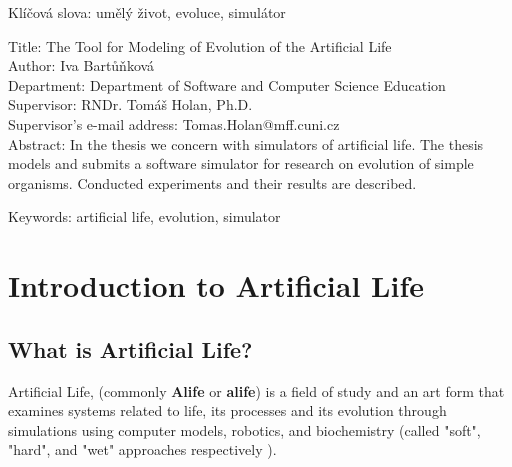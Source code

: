 \documentclass[a4paper,12pt]{report}
\begin{document}


\vspace{8mm}

\noindent Klíčová slova: umělý život, evoluce, simulátor

\vspace{10mm}

\noindent
Title: The Tool for Modeling of Evolution of the Artificial Life\\
Author: Iva Bartů\v{n}kov\'{a}\\
Department: Department of Software and Computer Science Education\\
Supervisor: RNDr. Tom\'{a}\v{s} Holan, Ph.D.\\
Supervisor's e-mail address: Tomas.Holan@mff.cuni.cz\\

\noindent Abstract: In the thesis we concern with simulators of artificial life. The thesis models and submits a software simulator for research on evolution of simple organisms. Conducted experiments and their results are described. 
 
\vspace{8mm}

\noindent Keywords: artificial life, evolution, simulator




\chapter{Introduction to Artificial Life}


\section{What is Artificial Life?}
Artificial Life, (commonly \textbf{Alife} or \textbf{alife}) is a field of study and an art form that examines systems related to life, its processes and its evolution through simulations using computer models, robotics, and biochemistry (called "soft", "hard", and "wet" approaches respectively \cite{Bedau}).
\end{document}
